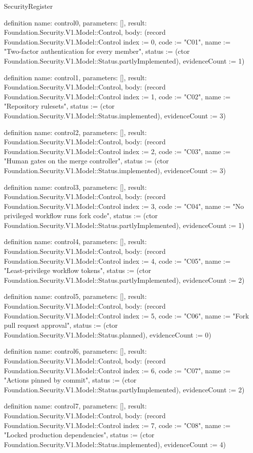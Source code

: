 \begin{lexlean}{SecurityRegister}
\begin{semanticmodule}
definition{
  name: control0,
  parameters: [],
  result: Foundation.Security.V1.Model::Control,
  body: (record Foundation.Security.V1.Model::Control {index := 0, code := "C01", name := "Two-factor authentication for every member", status := (ctor Foundation.Security.V1.Model::Status.partlyImplemented), evidenceCount := 1})
}

definition{
  name: control1,
  parameters: [],
  result: Foundation.Security.V1.Model::Control,
  body: (record Foundation.Security.V1.Model::Control {index := 1, code := "C02", name := "Repository rulesets", status := (ctor Foundation.Security.V1.Model::Status.implemented), evidenceCount := 3})
}

definition{
  name: control2,
  parameters: [],
  result: Foundation.Security.V1.Model::Control,
  body: (record Foundation.Security.V1.Model::Control {index := 2, code := "C03", name := "Human gates on the merge controller", status := (ctor Foundation.Security.V1.Model::Status.implemented), evidenceCount := 3})
}

definition{
  name: control3,
  parameters: [],
  result: Foundation.Security.V1.Model::Control,
  body: (record Foundation.Security.V1.Model::Control {index := 3, code := "C04", name := "No privileged workflow runs fork code", status := (ctor Foundation.Security.V1.Model::Status.partlyImplemented), evidenceCount := 1})
}

definition{
  name: control4,
  parameters: [],
  result: Foundation.Security.V1.Model::Control,
  body: (record Foundation.Security.V1.Model::Control {index := 4, code := "C05", name := "Least-privilege workflow tokens", status := (ctor Foundation.Security.V1.Model::Status.partlyImplemented), evidenceCount := 2})
}

definition{
  name: control5,
  parameters: [],
  result: Foundation.Security.V1.Model::Control,
  body: (record Foundation.Security.V1.Model::Control {index := 5, code := "C06", name := "Fork pull request approval", status := (ctor Foundation.Security.V1.Model::Status.planned), evidenceCount := 0})
}

definition{
  name: control6,
  parameters: [],
  result: Foundation.Security.V1.Model::Control,
  body: (record Foundation.Security.V1.Model::Control {index := 6, code := "C07", name := "Actions pinned by commit", status := (ctor Foundation.Security.V1.Model::Status.partlyImplemented), evidenceCount := 2})
}

definition{
  name: control7,
  parameters: [],
  result: Foundation.Security.V1.Model::Control,
  body: (record Foundation.Security.V1.Model::Control {index := 7, code := "C08", name := "Locked production dependencies", status := (ctor Foundation.Security.V1.Model::Status.implemented), evidenceCount := 4})
}


\end{semanticmodule}
\end{lexlean}
